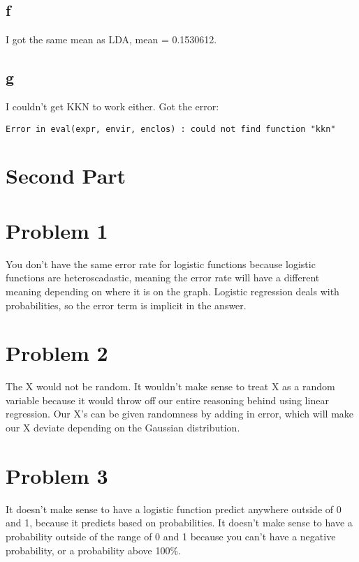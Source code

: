 \documentclass{article}
\begin{document}
\subsection*{f}
I got the same mean as LDA, mean = 0.1530612.\\


\subsection*{g}
I couldn't get KKN to work either. Got the error:\\
\begin{verbatim}
Error in eval(expr, envir, enclos) : could not find function "kkn"
\end{verbatim}

\section*{Second Part}

\section*{Problem 1}
You don't have the same error rate for logistic functions because logistic functions are heteroscadastic, meaning the error rate will have a different meaning depending on where it is on the graph. Logistic regression deals with probabilities, so the error term is implicit in the answer.\\

\section*{Problem 2}
The X would not be random. It wouldn't make sense to treat X as a random variable because it would throw off our entire reasoning behind using linear regression. Our X's can be given randomness by adding in error, which will make our X deviate depending on the Gaussian distribution.\\

\section*{Problem 3}
It doesn't make sense to have a logistic function predict anywhere outside of 0 and 1, because it predicts based on probabilities. It doesn't make sense to have a probability outside of the range of 0 and 1 because you can't have a negative probability, or a probability above 100\%.\\
\end{document}
